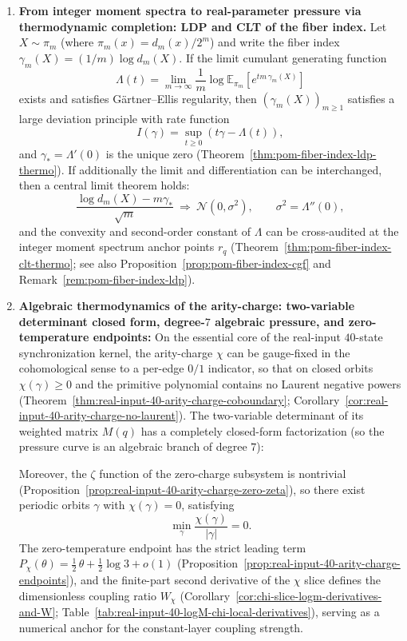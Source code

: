 \begin{theorem}
\begin{enumerate}
  \item \textbf{From integer moment spectra to real-parameter pressure via thermodynamic completion: LDP and CLT of the fiber index.}
  Let \(X\sim\pi_m\) (where \(\pi_m(x)=d_m(x)/2^m\)) and write the fiber index \(\gamma_m(X)=(1/m)\log d_m(X)\).
  If the limit cumulant generating function
  \[
  \Lambda(t)=\lim_{m\to\infty}\frac{1}{m}\log \mathbb{E}_{\pi_m}\!\left[e^{t m\,\gamma_m(X)}\right]
  \]
  exists and satisfies G\"artner--Ellis regularity, then \((\gamma_m(X))_{m\ge 1}\) satisfies a large deviation principle with rate function
  \[
  I(\gamma)=\sup_{t\ge 0}(t\gamma-\Lambda(t)),
  \]
  and \(\gamma_\ast=\Lambda'(0)\) is the unique zero (Theorem~\ref{thm:pom-fiber-index-ldp-thermo}).
  If additionally the limit and differentiation can be interchanged, then a central limit theorem holds:
  \[
  \frac{\log d_m(X)-m\gamma_\ast}{\sqrt m}\ \Longrightarrow\ \mathcal N(0,\sigma^2),
  \qquad \sigma^2=\Lambda''(0),
  \]
  and the convexity and second-order constant of \(\Lambda\) can be cross-audited at the integer moment spectrum anchor points \(r_q\) (Theorem~\ref{thm:pom-fiber-index-clt-thermo}; see also Proposition~\ref{prop:pom-fiber-index-cgf} and Remark~\ref{rem:pom-fiber-index-ldp}).

  \item \textbf{Algebraic thermodynamics of the arity-charge: two-variable determinant closed form, degree-\(7\) algebraic pressure, and zero-temperature endpoints:}
  On the essential core of the real-input \(40\)-state synchronization kernel, the arity-charge \(\chi\) can be gauge-fixed in the cohomological sense to a per-edge \(0/1\) indicator, so that on closed orbits \(\chi(\gamma)\ge 0\) and the primitive polynomial contains no Laurent negative powers (Theorem~\ref{thm:real-input-40-arity-charge-coboundary}; Corollary~\ref{cor:real-input-40-arity-charge-no-laurent}).
  The two-variable determinant of its weighted matrix \(M(q)\) has a completely closed-form factorization (so the pressure curve is an algebraic branch of degree \(7\)):
  
  Moreover, the \(\zeta\) function of the zero-charge subsystem is nontrivial (Proposition~\ref{prop:real-input-40-arity-charge-zero-zeta}), so there exist periodic orbits \(\gamma\) with \(\chi(\gamma)=0\), satisfying
  \[
  \min_{\gamma}\frac{\chi(\gamma)}{|\gamma|}=0.
  \]
  The zero-temperature endpoint has the strict leading term
  \(
  P_\chi(\theta)=\tfrac12\,\theta+\tfrac12\log 3+o(1)
  \)
  (Proposition~\ref{prop:real-input-40-arity-charge-endpoints}), and the finite-part second derivative of the \(\chi\) slice defines the dimensionless coupling ratio
  \(W_\chi\) (Corollary~\ref{cor:chi-slice-logm-derivatives-and-W}; Table~\ref{tab:real-input-40-logM-chi-local-derivatives}), serving as a numerical anchor for the constant-layer coupling strength.


\end{enumerate}
\end{theorem}
